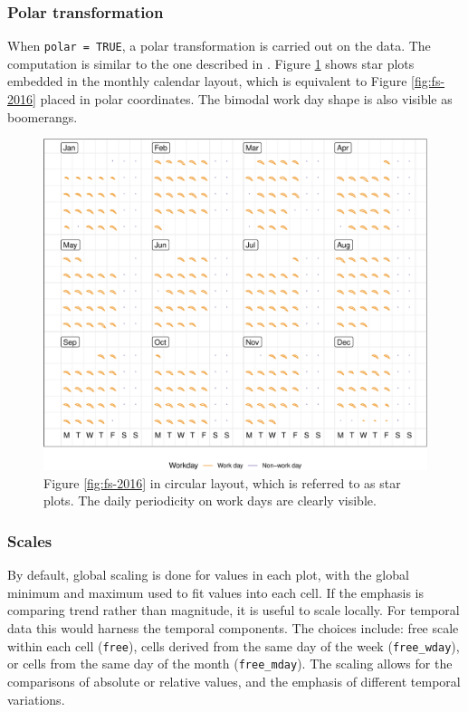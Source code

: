 \documentclass[12pt]{article}
\begin{document}
\hypertarget{polar-transformation}{%
\subsubsection{Polar transformation}\label{polar-transformation}}

When \texttt{polar\ =\ TRUE}, a polar transformation is carried out on
the data. The computation is similar to the one described in
\citet{Wickham2012glyph}. Figure \ref{fig:fs-polar} shows star plots
embedded in the monthly calendar layout, which is equivalent to Figure
\ref{fig:fs-2016} placed in polar coordinates. The bimodal work day
shape is also visible as boomerangs.

\begin{figure}

{\centering \includegraphics[width=\textwidth]{figure/fs-polar-1} 

}

\caption{Figure \ref{fig:fs-2016} in circular layout, which is referred to as star plots. The daily periodicity on work days are clearly visible.}\label{fig:fs-polar}
\end{figure}

\hypertarget{scales}{%
\subsubsection{Scales}\label{scales}}

By default, global scaling is done for values in each plot, with the
global minimum and maximum used to fit values into each cell. If the
emphasis is comparing trend rather than magnitude, it is useful to scale
locally. For temporal data this would harness the temporal components.
The choices include: free scale within each cell (\texttt{free}), cells
derived from the same day of the week (\texttt{free\_wday}), or cells
from the same day of the month (\texttt{free\_mday}). The scaling allows
for the comparisons of absolute or relative values, and the emphasis of
different temporal variations.
\end{document}
